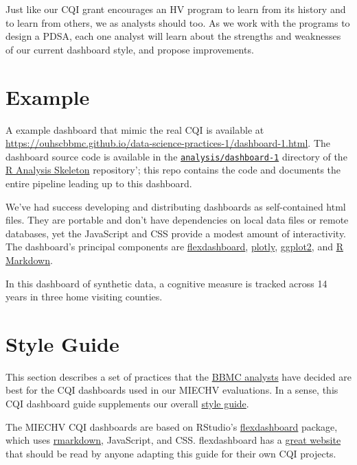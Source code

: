 \documentclass[
]{book}
\begin{document}
Just like our CQI grant encourages an HV program to learn from its history and to learn from others, we as analysts should too. As we work with the programs to design a PDSA, each one analyst will learn about the strengths and weaknesses of our current dashboard style, and propose improvements.

\hypertarget{example-dashboard-example}{%
\section{Example}\label{example-dashboard-example}}

A example dashboard that mimic the real CQI is available at \url{https://ouhscbbmc.github.io/data-science-practices-1/dashboard-1.html}. The dashboard source code is available in the \href{https://github.com/wibeasley/RAnalysisSkeleton/tree/master/analysis/dashboard-1}{\texttt{analysis/dashboard-1}} directory of the \href{https://github.com/wibeasley/RAnalysisSkeleton\#readme}{R Analysis Skeleton} repository'; this repo contains the code and documents the entire pipeline leading up to this dashboard.

We've had success developing and distributing dashboards as self-contained html files. They are portable and don't have dependencies on local data files or remote databases, yet the JavaScript and CSS provide a modest amount of interactivity. The dashboard's principal components are \href{https://rmarkdown.rstudio.com/flexdashboard/}{flexdashboard}, \href{https://plot.ly/r/}{plotly}, \href{https://ggplot2.tidyverse.org/}{ggplot2}, and \href{https://rmarkdown.rstudio.com/}{R Markdown}.

In this dashboard of synthetic data, a cognitive measure is tracked across 14 years in three home visiting counties.

\hypertarget{example-dashboard-guide}{%
\section{Style Guide}\label{example-dashboard-guide}}

This section describes a set of practices that the \href{https://ouhsc.edu/bbmc/}{BBMC analysts} have decided are best for the CQI dashboards used in our MIECHV evaluations. In a sense, this CQI dashboard guide supplements our overall \protect\hyperlink{style}{style guide}.

The MIECHV CQI dashboards are based on RStudio's \href{https://rmarkdown.rstudio.com/flexdashboard/}{flexdashboard} package, which uses \href{https://CRAN.R-project.org/package=rmarkdown}{rmarkdown}, JavaScript, and CSS. flexdashboard has a \href{https://rmarkdown.rstudio.com/flexdashboard/}{great website} that should be read by anyone adapting this guide for their own CQI projects.
\end{document}
